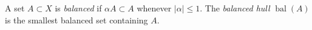 A set $A \subset X$ is \emph{balanced} if $\alpha A \subset A$ whenever $|\alpha| \leqslant 1$. The \emph{balanced hull} $\operatorname{bal}(A)$ is the smallest balanced set containing $A$.
